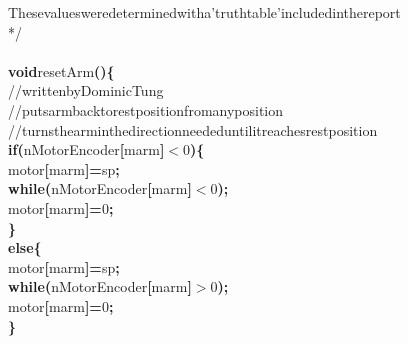 \documentclass[a4paper, 10pt]{article}
\newcommand\SPC{\hspace*{0.6em}}
\newcommand\TAB{\hspace*{1.2em}}
\newcommand\HYP{\mbox{\char 45}}
\newcommand{\CppAComment}[1]{\textcolor[rgb]{0,0.5,0}{\colorbox[rgb]{1,1,1}{#1}}}
\newcommand{\CppAIdentifier}[1]{#1}
\newcommand{\CppANumber}[1]{\textcolor[rgb]{0,0,1}{\colorbox[rgb]{1,1,1}{#1}}}
\newcommand{\CppAReservedWord}[1]{\textbf{\colorbox[rgb]{1,1,1}{#1}}}
\newcommand{\CppASpace}[1]{\colorbox[rgb]{1,1,1}{#1}}
\newcommand{\CppASymbol}[1]{\textbf{\textcolor[rgb]{1,0,0}{\colorbox[rgb]{1,1,1}{#1}}}}
\begin{document}
\begin{ttfamily}
\CppAComment{These\SPC values\SPC were\SPC determined\SPC with\SPC a\SPC 'truth\SPC table'\SPC included\SPC in\SPC the\SPC report}\\
\CppAComment{*/}\\
\\
\CppAReservedWord{void}\CppASpace{\SPC }\CppAIdentifier{resetArm}\CppASymbol{(}\CppASymbol{)}\CppASymbol{\{}\\
\CppASpace{\TAB }\CppAComment{//\SPC written\SPC by\SPC Dominic\SPC Tung}\\
\CppASpace{\TAB }\CppAComment{//puts\SPC arm\SPC back\SPC to\SPC rest\SPC position\SPC from\SPC any\SPC position}\\
\CppASpace{\TAB }\CppAComment{//turns\SPC the\SPC arm\SPC in\SPC the\SPC direction\SPC needed\SPC until\SPC it\SPC reaches\SPC rest\SPC position}\\
\CppASpace{\TAB }\CppAReservedWord{if}\CppASpace{\SPC }\CppASymbol{(}\CppAIdentifier{nMotorEncoder}\CppASymbol{[}\CppAIdentifier{marm}\CppASymbol{]}\CppASymbol{$<$}\CppANumber{0}\CppASymbol{)}\CppASymbol{\{}\\
\CppASpace{\TAB \TAB }\CppAIdentifier{motor}\CppASymbol{[}\CppAIdentifier{marm}\CppASymbol{]}\CppASymbol{=}\CppAIdentifier{sp}\CppASymbol{;}\\
\CppASpace{\TAB \TAB }\CppAReservedWord{while}\CppASpace{\SPC }\CppASymbol{(}\CppAIdentifier{nMotorEncoder}\CppASymbol{[}\CppAIdentifier{marm}\CppASymbol{]}\CppASymbol{$<$}\CppANumber{0}\CppASymbol{)}\CppASymbol{;}\\
\CppASpace{\TAB \TAB }\CppAIdentifier{motor}\CppASymbol{[}\CppAIdentifier{marm}\CppASymbol{]}\CppASymbol{=}\CppANumber{0}\CppASymbol{;}\\
\CppASpace{\TAB }\CppASymbol{\}}\\
\CppASpace{\TAB }\CppAReservedWord{else}\CppASymbol{\{}\\
\CppASpace{\TAB \TAB }\CppAIdentifier{motor}\CppASymbol{[}\CppAIdentifier{marm}\CppASymbol{]}\CppASymbol{=}\CppASymbol{\HYP }\CppAIdentifier{sp}\CppASymbol{;}\\
\CppASpace{\TAB \TAB }\CppAReservedWord{while}\CppASpace{\SPC }\CppASymbol{(}\CppAIdentifier{nMotorEncoder}\CppASymbol{[}\CppAIdentifier{marm}\CppASymbol{]}\CppASymbol{$>$}\CppANumber{0}\CppASymbol{)}\CppASymbol{;}\\
\CppASpace{\TAB \TAB }\CppAIdentifier{motor}\CppASymbol{[}\CppAIdentifier{marm}\CppASymbol{]}\CppASymbol{=}\CppANumber{0}\CppASymbol{;}\\
\CppASpace{\TAB }\CppASymbol{\}}\\

\end{ttfamily}
\end{document}
